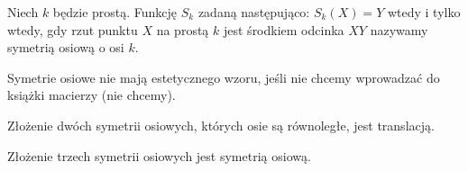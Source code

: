 
\begin{definition}
    Niech $k$ będzie prostą.
    Funkcję $S_k$ zadaną następująco: $S_k(X) = Y$ wtedy i tylko wtedy, gdy rzut punktu $X$ na prostą $k$ jest środkiem odcinka $XY$ nazywamy symetrią osiową o osi $k$.
\end{definition}

Symetrie osiowe nie mają estetycznego wzoru, jeśli nie chcemy wprowadzać do książki macierzy (nie chcemy).

\begin{proposition}
    \label{kordos_banach_6}%
    Złożenie dwóch symetrii osiowych, których osie są równoległe, jest translacją.
\end{proposition}

\begin{proposition}
    Złożenie trzech symetrii osiowych jest symetrią osiową.
\end{proposition}